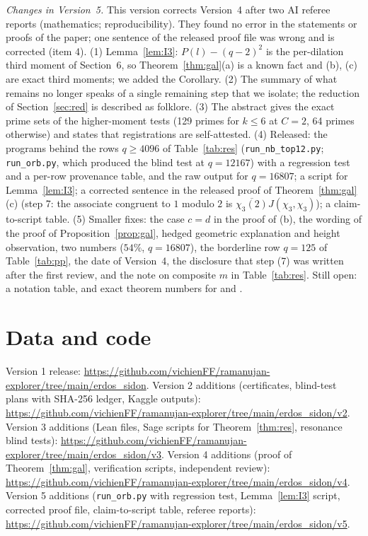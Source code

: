 \documentclass[11pt]{article}
\begin{document}
\emph{Changes in Version~5.} This version corrects Version~4 after two AI referee reports (mathematics; reproducibility). They found no error in the statements or proofs of the paper; one sentence of the released proof file was wrong and is corrected (item 4).
(1) Lemma~\ref{lem:I3}: $P(l)-(q-2)^2$ is the per-dilation third moment of Section~6, so Theorem~\ref{thm:gal}(a) is a known fact and (b), (c) are exact third moments; we added the Corollary.
(2) The summary of what remains no longer speaks of a single remaining step that we isolate; the reduction of Section~\ref{sec:red} is described as folklore.
(3) The abstract gives the exact prime sets of the higher-moment tests (129 primes for $k\le6$ at $C=2$, 64 primes otherwise) and states that registrations are self-attested.
(4) Released: the programs behind the rows $q\ge4096$ of Table~\ref{tab:res} (\texttt{run\_nb\_top12.py}; \texttt{run\_orb.py}, which produced the blind test at $q=12167$) with a regression test and a per-row provenance table, and the raw output for $q=16807$; a script for Lemma~\ref{lem:I3};
a corrected sentence in the released proof of Theorem~\ref{thm:gal}(c) (step 7: the associate congruent to $1$ modulo $2$ is $\overline{\chi_3(2)}J(\chi_3,\chi_3)$); a claim-to-script table.
(5) Smaller fixes: the case $c=d$ in the proof of (b), the wording of the proof of Proposition~\ref{prop:gal}, hedged geometric explanation and height observation, two numbers ($54\%$, $q=16807$), the borderline row $q=125$ of Table~\ref{tab:pp}, the date of Version~4, the disclosure that step (7) was written after the first review, and the note on composite $m$ in Table~\ref{tab:res}.
Still open: a notation table, and exact theorem numbers for \cite{On} and \cite{IR}.

\section*{Data and code}
Version 1 release: \url{https://github.com/vichienFF/ramanujan-explorer/tree/main/erdos_sidon}. Version 2 additions (certificates,
blind-test plans with SHA-256 ledger, Kaggle outputs): \url{https://github.com/vichienFF/ramanujan-explorer/tree/main/erdos_sidon/v2}. Version 3 additions (Lean files, Sage scripts for Theorem~\ref{thm:res}, resonance blind tests): \url{https://github.com/vichienFF/ramanujan-explorer/tree/main/erdos_sidon/v3}. Version 4 additions (proof of Theorem~\ref{thm:gal}, verification scripts, independent review): \url{https://github.com/vichienFF/ramanujan-explorer/tree/main/erdos_sidon/v4}. Version 5 additions (\texttt{run\_orb.py} with regression test, Lemma~\ref{lem:I3} script, corrected proof file, claim-to-script table, referee reports): \url{https://github.com/vichienFF/ramanujan-explorer/tree/main/erdos_sidon/v5}.
\end{document}
